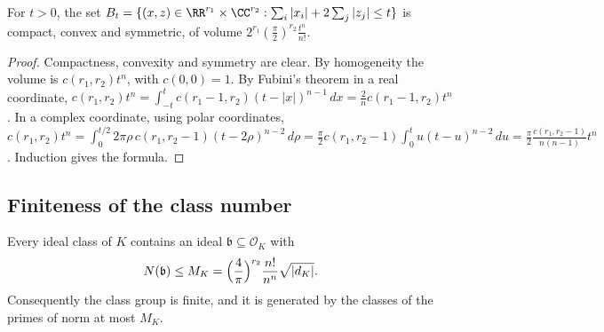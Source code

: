 \begin{lemma}\label{algebraic-number-theory:lemma-volume-octahedron}
For $t > 0$, the set $B_t = \{(x, z) \in \RR^{r_1} \times \CC^{r_2} : \sum_i|x_i| + 2\sum_j|z_j| \leq t\}$ is compact, convex and symmetric, of volume $2^{r_1}(\frac\pi2)^{r_2}\frac{t^n}{n!}$.
\end{lemma}

\begin{proof}
Compactness, convexity and symmetry are clear. By homogeneity the volume is $c(r_1, r_2)t^n$, with $c(0, 0) = 1$. By Fubini's theorem in a real coordinate,
$c(r_1, r_2)t^n = \int_{-t}^{t}c(r_1 - 1, r_2)(t - |x|)^{n-1}\,dx = \frac{2}{n}c(r_1 - 1, r_2)t^n$. In a complex coordinate, using polar coordinates,
$c(r_1, r_2)t^n = \int_0^{t/2}2\pi\rho\,c(r_1, r_2 - 1)(t - 2\rho)^{n-2}\,d\rho = \frac\pi2c(r_1, r_2 - 1)\int_0^tu(t - u)^{n-2}\,du = \frac{\pi}{2}\frac{c(r_1, r_2 - 1)}{n(n - 1)}t^n$. Induction gives the formula.
\end{proof}

\subsection{Finiteness of the class number}\label{algebraic-number-theory:subsection-class-number}

\begin{theorem}\label{algebraic-number-theory:theorem-minkowski-bound}
Every ideal class of $K$ contains an ideal $\mathfrak{b} \subseteq \mathcal{O}_K$ with
\[
N(\mathfrak{b}) \leq M_K = \Bigl(\frac4\pi\Bigr)^{r_2}\frac{n!}{n^n}\sqrt{|d_K|}.
\]
Consequently the class group is finite, and it is generated by the classes of the primes of norm at most $M_K$.
\end{theorem}

